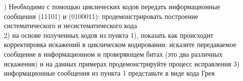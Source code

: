 ) Необходимо с помощью циклических кодов  передать  информационные сообщения (11101) и (0100011): продемонстрировать построение систематического и несистематического кода \\
2) на основе полученных кодов из пункта 1), показать как происходит корректировка искажений в циклическом кодировании: исказите передаваемое сообщение в информационном и проверяющем битах (это два различных искажения) и на данных примерах продемонстрируйте процесс исправления 
3) информационные сообщения из пункта 1 представьте в виде кода Грея
